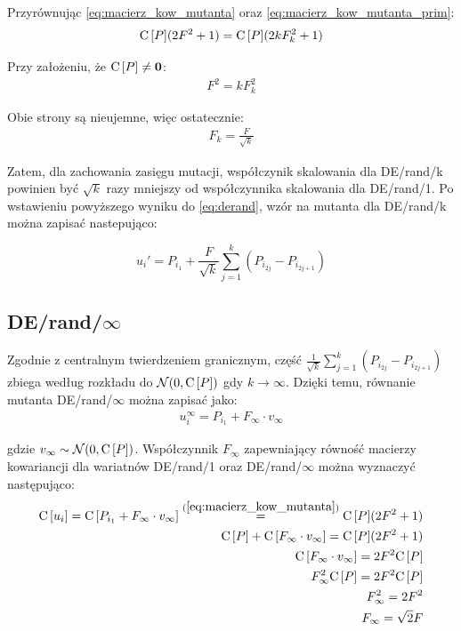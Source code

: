 \documentclass[a4paper,onecolumn,oneside,12pt,wide,floatssmall]{mwrep}
\def\C{{\rm C}\,}
\theoremstyle{definition}
\theoremstyle{plain}%
\theoremstyle{remark}
\begin{document}
Przyrównując \eqref{eq:macierz_kow_mutanta} oraz \eqref{eq:macierz_kow_mutanta_prim}:
\begin{align*}
\C[P](2F^2 + 1) = \C[P](2kF_k^2 + 1)
\end{align*}

Przy założeniu, że $\C[P] \neq \textbf{0}$:
\begin{align*}
F^2 = kF_k^2
\end{align*}

Obie strony są nieujemne, więc ostatecznie:
\begin{align*}
F_k = \frac{F}{\sqrt{k}}
\end{align*}

Zatem, dla zachowania zasięgu mutacji, współczynik skalowania dla DE/rand/k powinien być  
$\sqrt{k}$ razy mniejszy od współczynnika skalowania dla DE/rand/1. Po wstawieniu powyższego wyniku
do \eqref{eq:derand}, wzór na mutanta dla DE/rand/k można zapisać nastepująco:

$$ u_i' = P_{i_1} + \frac{F}{\sqrt{k}}\sum\limits_{j=1}^k (P_{i_{2j}} - P_{i_{2j+1}}) $$

\subsection{DE/rand/$\infty$}
\label{sub:de_rand_inf}

Zgodnie z centralnym twierdzeniem granicznym, część $\frac{1}{{\sqrt{k}}}\sum\limits_{j=1}^k (P_{i_{2j}} - P_{i_{2j+1}})$ 
zbiega według rozkładu do $\mathcal{N}(0, \C[P])$ gdy $k \to \infty$. 
Dzięki temu, równanie mutanta DE/rand/$\infty$ można zapisać jako:
\begin{align*}
u_i^\infty = P_{i_1} + F_\infty \cdot v_\infty
\end{align*}

gdzie $v_\infty \sim \mathcal{N}(0, \C[P])$. Współczynnik $F_\infty$ zapewniający
równość macierzy kowariancji dla wariatnów DE/rand/1 oraz DE/rand/$\infty$
można wyznaczyć następująco:
\begin{align*}
\C[u_i] = \C[P_{i_1} + F_\infty \cdot v_\infty] \overset{(\ref{eq:macierz_kow_mutanta})}{=} \C[P](2F^2 + 1) \\
\C[P] + \C[F_\infty \cdot v_\infty] = \C[P](2F^2 + 1) \\
\C[F_\infty \cdot v_\infty] = 2F^2\C[P] \\
F_\infty^2 \C[P] = 2F^2\C[P] \\
F_\infty^2 = 2F^2 \\
F_\infty = \sqrt{2}F
\end{align*}
\end{document}

